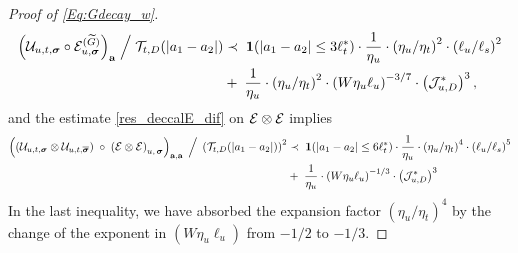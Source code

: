 \documentclass[10pt,reqno]{article}
\theoremstyle{plain} %
\theoremstyle{remark}
\numberwithin{equation}{section}
\begin{document}
\begin{proof}[Proof of \eqref{Eq:Gdecay_w}]
\begin{align}  \label{res_deccalE_2}
     \Big(\mathcal{U}_{u,t, \boldsymbol{\sigma}} \circ  \mathcal{E}^{( \widetilde{G} )}_{u, \boldsymbol{\sigma}}\Big)_{\mathbf{a}} 
    \;\Big/\; 
{\cal T}_{t, D}(|a_1-a_2|)
 &\prec \;  {\bf1}(|a_1-a_2|\le 3\ell_t^*)\cdot  \frac{1} {\eta_u} \cdot \left(\eta_u / \eta_t\right)^2\cdot \left(\ell_u / \ell_s\right)^2 
 \nonumber \\
  &+\;    \frac{1}{\eta_u} 
  \cdot\left(\eta_u / \eta_t\right)^2 \cdot
       \left(W \eta_u \ell_u\right)^{-3/7}  \cdot \left({\cal J}^{*}_{u,D} \right)^{3 }, 
       \end{align} 
and  the  estimate  \eqref{res_deccalE_dif} on $\cal E\otimes\cal E$  implies  
\begin{align} \label{res_deccalE_3}
  \left(\left(
   \mathcal{U}_{u, t,  \boldsymbol{\sigma}}
   \otimes 
   \mathcal{U}_{u, t,  \overline{\boldsymbol{\sigma}}}
   \right) \;\circ  \;
   \left( \mathcal{E} \otimes  \mathcal{E} \right)
   _{u, \,\boldsymbol{\sigma}  }
   \right)_{{\textbf a}, {\textbf a}}
     \;\Big/\; 
 \left({\cal T}_{t, D}(|a_1-a_2|)\right)^2
 &\prec \;  {\bf1}(|a_1-a_2|\le 6\ell_t^*)\cdot  \frac{1} {\eta_u} \cdot \left(\eta_u / \eta_t\right)^4\cdot \left(\ell_u / \ell_s\right)^5 
 \nonumber \\
 &+ \;  \frac{1}{\eta_u} 
  \cdot
       \left(W \eta_u \ell_u\right)^{-1/3}  \cdot \left({\cal J}^{*}_{u,D} \right)^{3 }  
\end{align}
In the last inequality, we have absorbed the  expansion factor $\left(\eta_u / \eta_t\right)^4$ by the change of the exponent in $   \left(W \eta_u \ell_u\right)$ from $-1/2$ to $-1/3$.  



\end{proof}
\end{document}
